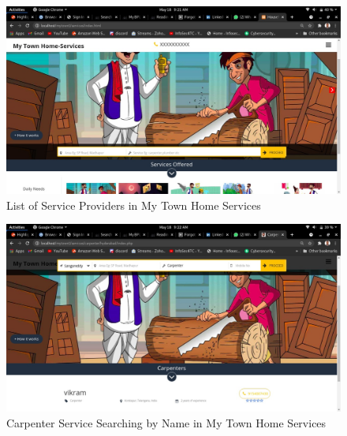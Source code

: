 \documentclass[12pt,a4paper]{report}
\begin{document}
\begin{titlepage}
{{\begin{figure}[h!]
	\begin{center}
		\includegraphics[width=\linewidth]{services.jpeg}
	\end{center}
	\caption{List of Service Providers in My Town Home Services}
\end{figure}
\begin{figure}[h!]
	\begin{center}
		 \includegraphics[width=\linewidth]{car.jpeg}
	\end{center}
	\caption{Carpenter Service Searching by Name in My Town Home Services}
\end{figure}
 
\vspace{0.75}
\raggedright
}}
\end{titlepage}
\end{document}
